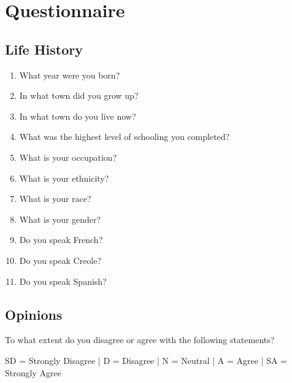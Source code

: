 

\section{Questionnaire}
  \subsection{Life History}
    \begin{enumerate}
      \item What year were you born? \hrulefill
      \item In what town did you grow up? \hrulefill
      \item In what town do you live now? \hrulefill
      \item What was the highest level of schooling you completed? \hrulefill
      \item What is your occupation? \hrulefill
      \item What is your ethnicity? \hrulefill
      \item What is your race? \hrulefill
      \item What is your gender? \hrulefill
      \item Do you speak French? \hrulefill
      \item Do you speak Creole? \hrulefill
      \item Do you speak Spanish? \hrulefill
    \end{enumerate}

  \subsection{Opinions}
    \noindent To what extent do you disagree or agree with the following statements?

    \noindent SD = Strongly Disagree | D = Disagree | N = Neutral | A = Agree | SA = Strongly Agree


